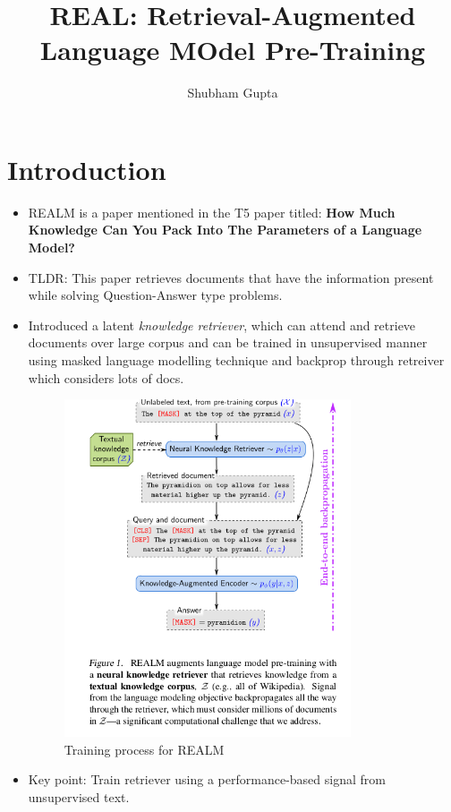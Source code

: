 \documentclass[a4paper]{article}
\title{REAL: Retrieval-Augmented Language MOdel Pre-Training}
\author{Shubham Gupta}
\begin{document}
\maketitle
\section{Introduction}
\begin{itemize}
    \item REALM is a paper mentioned in the T5 paper titled: \textbf{How Much Knowledge Can You Pack Into The Parameters of a Language Model?}
    \item TLDR: This paper retrieves documents that have the information present while solving Question-Answer type problems.
    \item Introduced a latent \textit{knowledge retriever}, which can attend and retrieve documents over large corpus and can be trained in unsupervised manner using masked language modelling technique and backprop through retreiver which considers lots of docs.
        \begin{figure}[H]
            \centering
            \includegraphics[width=0.8\textwidth]{training}
            \caption{Training process for REALM}
            \label{fig:training}
        \end{figure}
    \item Key point: Train retriever using a performance-based signal from unsupervised text.

\end{itemize}
\end{document}
